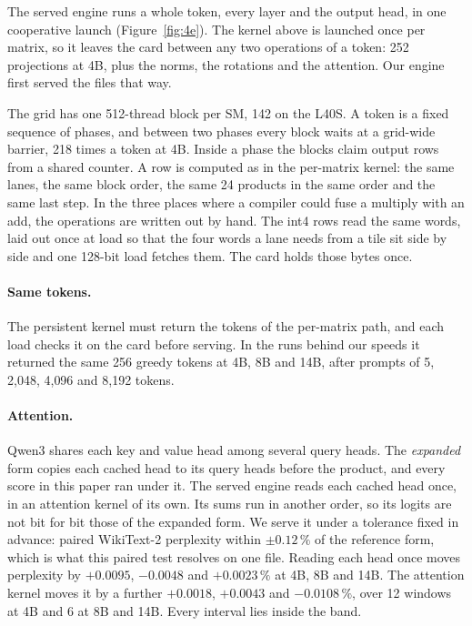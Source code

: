 The served engine runs a whole token, every layer and the output head, in one
cooperative launch (Figure~\ref{fig:4e}). The kernel above is launched once
per matrix, so it leaves the card between any two operations of a token: 252
projections at 4B, plus the norms, the rotations and the attention. Our engine
first served the files that way.

The grid has one 512-thread block per SM, 142 on the L40S. A token is a fixed
sequence of phases, and between two phases every block waits at a grid-wide
barrier, 218 times a token at 4B. Inside a phase the blocks claim output rows
from a shared counter. A \Tetra{} row is computed as in the per-matrix
kernel: the same lanes, the same block order, the same 24
products in the same order and the same last step. In the three places where
a compiler could fuse a multiply with an add, the operations are written out
by hand. The int4 rows read the same words, laid out once at load so that the
four words a lane needs from a tile sit side by side and one 128-bit load
fetches them. The card holds those bytes once.

\paragraph{Same tokens.} The persistent kernel must return the tokens of the
per-matrix path, and each load checks it on the card before serving. In the
runs behind our speeds it returned the same 256 greedy tokens at 4B, 8B and
14B, after prompts of 5, 2{,}048, 4{,}096 and 8{,}192 tokens.

\paragraph{Attention.}\label{sec:attn} Qwen3 shares each key and value head
among several query heads. The \emph{expanded} form copies each cached head
to its query heads before the product, and every score in this paper ran
under it. The served engine reads each cached head once, in an attention
kernel of its own. Its sums run in another order, so its logits are not bit
for bit those of the expanded form. We serve it under a tolerance fixed in
advance: paired WikiText-2 perplexity within $\pm0.12\,\%$ of the reference
form, which is what this paired test resolves on one file. Reading each head
once moves perplexity by $+0.0095$, $-0.0048$ and $+0.0023\,\%$ at 4B, 8B and
14B. The attention kernel moves it by a further $+0.0018$, $+0.0043$ and
$-0.0108\,\%$, over 12 windows at 4B and 6 at 8B and 14B. Every interval lies
inside the band.

